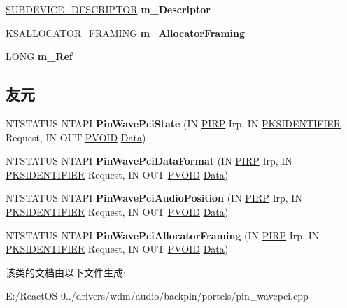 \begin{DoxyCompactItemize}
\hyperlink{struct_s_u_b_d_e_v_i_c_e___d_e_s_c_r_i_p_t_o_r}{S\+U\+B\+D\+E\+V\+I\+C\+E\+\_\+\+D\+E\+S\+C\+R\+I\+P\+T\+OR} {\bfseries m\+\_\+\+Descriptor}
\item 
\mbox{\label{class_c_port_pin_wave_pci_ae9cb08d63be89d7b13550661da75c819}} 
\hyperlink{struct_k_s_a_l_l_o_c_a_t_o_r___f_r_a_m_i_n_g}{K\+S\+A\+L\+L\+O\+C\+A\+T\+O\+R\+\_\+\+F\+R\+A\+M\+I\+NG} {\bfseries m\+\_\+\+Allocator\+Framing}
\item 
\mbox{\label{class_c_port_pin_wave_pci_afb5fe0bc177ff69847a518bc1a9208a5}} 
L\+O\+NG {\bfseries m\+\_\+\+Ref}
\end{DoxyCompactItemize}
\subsection*{友元}
\begin{DoxyCompactItemize}
\item 
\mbox{\label{class_c_port_pin_wave_pci_a338821e58df75a3aea1c5ae1cc80e8a9}} 
N\+T\+S\+T\+A\+T\+US N\+T\+A\+PI {\bfseries Pin\+Wave\+Pci\+State} (IN \hyperlink{interfacevoid}{P\+I\+RP} Irp, IN \hyperlink{struct_k_s_i_d_e_n_t_i_f_i_e_r}{P\+K\+S\+I\+D\+E\+N\+T\+I\+F\+I\+ER} Request, IN O\+UT \hyperlink{interfacevoid}{P\+V\+O\+ID} \hyperlink{struct_data}{Data})
\item 
\mbox{\label{class_c_port_pin_wave_pci_a8fb09b722579af3096fd57b44bdc5ac6}} 
N\+T\+S\+T\+A\+T\+US N\+T\+A\+PI {\bfseries Pin\+Wave\+Pci\+Data\+Format} (IN \hyperlink{interfacevoid}{P\+I\+RP} Irp, IN \hyperlink{struct_k_s_i_d_e_n_t_i_f_i_e_r}{P\+K\+S\+I\+D\+E\+N\+T\+I\+F\+I\+ER} Request, IN O\+UT \hyperlink{interfacevoid}{P\+V\+O\+ID} \hyperlink{struct_data}{Data})
\item 
\mbox{\label{class_c_port_pin_wave_pci_ab87ed53566cc7cd96450d12f16576d77}} 
N\+T\+S\+T\+A\+T\+US N\+T\+A\+PI {\bfseries Pin\+Wave\+Pci\+Audio\+Position} (IN \hyperlink{interfacevoid}{P\+I\+RP} Irp, IN \hyperlink{struct_k_s_i_d_e_n_t_i_f_i_e_r}{P\+K\+S\+I\+D\+E\+N\+T\+I\+F\+I\+ER} Request, IN O\+UT \hyperlink{interfacevoid}{P\+V\+O\+ID} \hyperlink{struct_data}{Data})
\item 
\mbox{\label{class_c_port_pin_wave_pci_a312f26ec00783e5fc5b87e9559d6ae5b}} 
N\+T\+S\+T\+A\+T\+US N\+T\+A\+PI {\bfseries Pin\+Wave\+Pci\+Allocator\+Framing} (IN \hyperlink{interfacevoid}{P\+I\+RP} Irp, IN \hyperlink{struct_k_s_i_d_e_n_t_i_f_i_e_r}{P\+K\+S\+I\+D\+E\+N\+T\+I\+F\+I\+ER} Request, IN O\+UT \hyperlink{interfacevoid}{P\+V\+O\+ID} \hyperlink{struct_data}{Data})
\end{DoxyCompactItemize}


该类的文档由以下文件生成\+:\begin{DoxyCompactItemize}
\item 
E\+:/\+React\+O\+S-\/0../drivers/wdm/audio/backpln/portcls/pin\+\_\+wavepci.\+cpp\end{DoxyCompactItemize}
